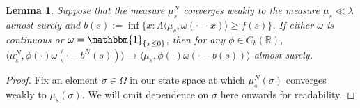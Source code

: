 \documentclass{article}
\newtheorem{lemma}[theorem]{Lemma}
\newcommand{\B}[1]{\mathbb{#1}}
\newcommand{\is}{\mathbbm{1}}
\begin{document}
 

\begin{lemma} \label{bConvLemma}
    Suppose that the measure $\mu^N_s$ converges weakly to the measure $\mu_s\ll\lambda$ almost surely and $b(s):=\inf\{x:\Lambda\langle \mu_s,\omega(\cdot-x)\rangle \geq f(s)\}$. If either $\omega$ is continuous or $\omega = \is_{\{x\leq 0\}}$, then for any $\phi\in C_b(\B{R})$, %
    $\langle \mu^N_s,\phi(\cdot)\omega(\cdot-b^N(s))\rangle\to\langle \mu_s, \phi(\cdot)\omega(\cdot-b(s))\rangle$ almost surely. 
\end{lemma}

\begin{proof}
    Fix an element $\sigma\in \Omega$ in our state space at which $\mu_s^N(\sigma)$ converges weakly to $\mu_s(\sigma)$. We will omit dependence on $\sigma$ here onwards for readability. 
    

\end{proof}
\end{document}
